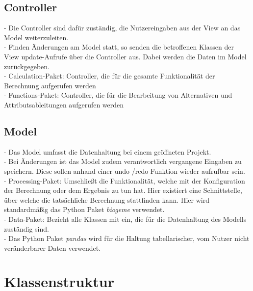 \documentclass{article}
\begin{document}
\subsection{Controller}
- Die Controller sind dafür zuständig, die Nutzereingaben aus der View an das Model weiterzuleiten.\\
- Finden Änderungen am Model statt, so senden die betroffenen Klassen der View update-Aufrufe über die Controller aus. Dabei werden die Daten im Model zurückgegeben.\\
- Calculation-Paket: Controller, die für die gesamte Funktionalität der Berechnung aufgerufen werden\\
- Functions-Paket: Controller, die für die Bearbeitung von Alternativen und Attributsableitungen aufgerufen werden
\subsection{Model}
- Das Model umfasst die Datenhaltung bei einem geöffneten Projekt. \\
- Bei Änderungen ist das Model zudem verantwortlich vergangene Eingaben zu speichern. Diese sollen anhand einer undo-/redo-Funktion wieder aufrufbar sein.\\
- Processing-Paket: Umschließt die Funktionalität, welche mit der Konfiguration der Berechnung oder dem Ergebnis zu tun hat. Hier existiert eine Schnittstelle, über welche die tatsächliche Berechnung stattfinden kann. Hier wird standardmäßig das Python Paket \textit{biogeme} verwendet. \\
- Data-Paket: Bezieht alle Klassen mit ein, die für die Datenhaltung des Modells zuständig sind. \\
- Das Python Paket \textit{pandas} wird für die Haltung tabellarischer, vom Nutzer nicht veränderbarer Daten verwendet.


\newpage
\section{Klassenstruktur}
\end{document}
